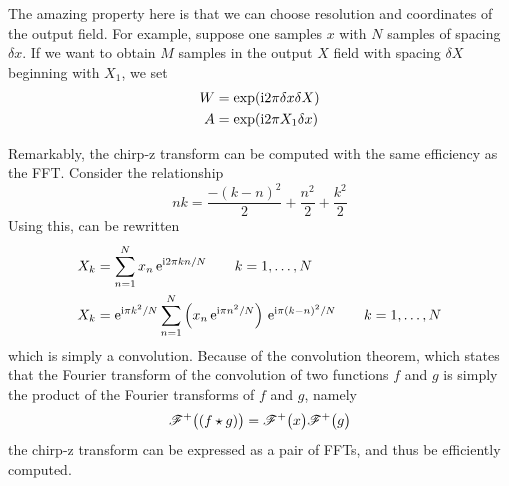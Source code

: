 The amazing property here is that we can choose resolution and coordinates
of the output field.  For example, suppose one samples $x$ with $N$ samples
of spacing $\delta x$.  If we want to obtain $M$ samples in the output
$X$ field with spacing $\delta X$ beginning with $X_1$, we set
\begin{align}
								W&=\exp({\mathrm{i}} 2 \pi \delta x \delta X)\\
								A&=\exp({\mathrm{i}} 2 \pi X_1 \delta x)
\end{align}

Remarkably, the chirp-z transform can be computed with the same efficiency
as the FFT.  Consider the relationship
\begin{equation}
n k = \frac{-(k-n)^2}{2} + \frac{n^2}{2} + \frac{k^2}{2}
\end{equation}
Using this,  can be rewritten
\begin{align}
								X_k &= \sum_{n=1}^{N} x_n\, {\mathrm{e}}^{{\mathrm{i}} 2\pi k n/N} \qquad k=1,\ldots,N\\
								X_k &= {\mathrm{e}}^{{\mathrm{i}} \pi k^2/N} \sum_{n=1}^{N} \left(x_n\, {\mathrm{e}}^{{\mathrm{i}} \pi n^2/N}\right)\,
								{\mathrm{e}}^{{\mathrm{i}} \pi(k-n)^2/N}\qquad k=1,\ldots,N\\
\end{align}
which is simply a convolution.  Because of the convolution theorem, which
states that the Fourier transform of the
convolution of two functions $f$ and $g$ is simply the product of the
Fourier transforms of $f$ and $g$, namely
\begin{equation}
{\mathscr{F}^{+}\bigl(\left(f \star g\right)\bigr)} = {\mathscr{F}^{+}\bigl(x\bigr)}{\mathscr{F}^{+}\bigl(g\bigr)}
\end{equation}
the chirp-z transform can be expressed as a pair of FFTs, and thus be
efficiently computed.
